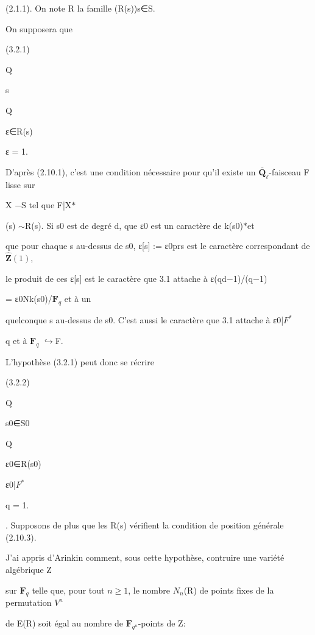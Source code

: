 \documentclass[11pt]{article}
\begin{document}
\noindent (2.1.1). On note R la famille (R(s))s∈S.\par
\noindent On supposera que\par
\noindent (3.2.1)\par
\noindent Q\par
\noindent s\par
\noindent Q\par
\noindent ε∈R(s)\par
\noindent ε = 1.\par
\noindent D’après (2.10.1), c’est une condition nécessaire pour qu’il existe un \(\overline{\mathbf Q}_{\ell}\)-faisceau F lisse sur\par
\noindent X −S tel que F|X\(*\)\par
\noindent (s) \(\sim\)R(s). Si s0 est de degré d, que ε0 est un caractère de k(s0)\(*\)et\par
\noindent que pour chaque s au-dessus de s0, ε[s] := ε0prs est le caractère correspondant de \(\widehat{\mathbf Z}(1)\),\par
\noindent le produit de ces ε[s] est le caractère que 3.1 attache à ε(qd−1)/(q−1)\par
\noindent = ε0Nk(s0)/\(\mathbf F_q\) et à un\par
\noindent quelconque s au-dessus de s0. C’est aussi le caractère que 3.1 attache à ε0|\(F^*\)\par
\noindent q et à \(\mathbf F_q\) \(\hookrightarrow\)F.\par
\noindent L’hypothèse (3.2.1) peut donc se récrire\par
\noindent (3.2.2)\par
\noindent Q\par
\noindent s0∈S0\par
\noindent Q\par
\noindent ε0∈R(s0)\par
\noindent ε0|\(F^*\)\par
\noindent q = 1.\par
{}. Supposons de plus que les R(s) vérifient la condition de position générale (2.10.3).\par
\noindent J’ai appris d’Arinkin comment, sous cette hypothèse, contruire une variété algébrique Z\par
\noindent sur \(\mathbf F_q\) telle que, pour tout \(n\geq 1\), le nombre \(N_n\)(R) de points fixes de la permutation \(V^n\)\par
\noindent de E(R) soit égal au nombre de \(\mathbf F_{q^n}\)-points de Z:\par
\end{document}
